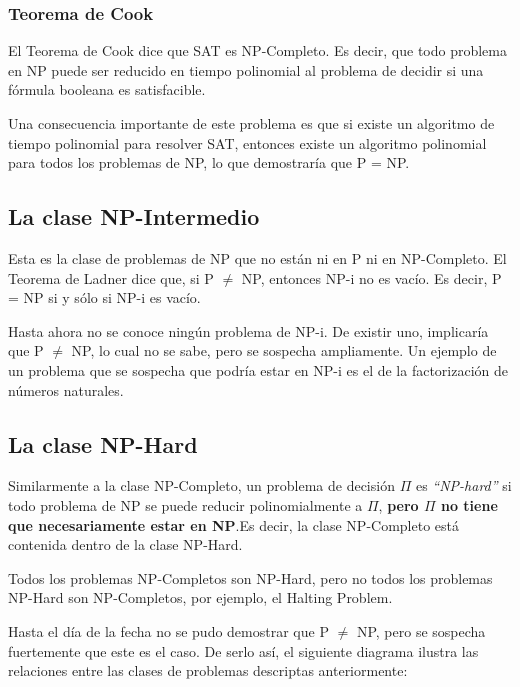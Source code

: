 \subsubsection{Teorema de Cook}

El Teorema de Cook dice que SAT es NP-Completo. Es decir, que todo problema en NP puede ser reducido en tiempo polinomial al problema de decidir si una f\'ormula booleana es satisfacible.

Una consecuencia importante de este problema es que si existe un algoritmo de tiempo polinomial para resolver SAT, entonces existe un algoritmo polinomial para todos los problemas de NP, lo que demostrar\'ia que P = NP.


\subsection{La clase NP-Intermedio}

Esta es la clase de problemas de NP que no est\'an ni en P ni en NP-Completo. El Teorema de Ladner dice que, si P $\neq$ NP, entonces NP-i no es vac\'io. Es decir, P = NP si y s\'olo si NP-i es vac\'io.

Hasta ahora no se conoce ning\'un problema de NP-i. De existir uno, implicar\'ia que P $\neq$ NP, lo cual no se sabe, pero se sospecha ampliamente. Un ejemplo de un problema que se sospecha que podr\'ia estar en NP-i es el de la factorizaci\'on de n\'umeros naturales.

\newpage
\subsection{La clase NP-Hard}

Similarmente a la clase NP-Completo, un problema de decisi\'on $\Pi$ es \emph{``NP-hard''} si todo problema de NP se puede reducir polinomialmente a $\Pi$, \textbf{pero $\Pi$ no tiene que necesariamente estar en NP}.Es decir, la clase NP-Completo est\'a contenida dentro de la clase NP-Hard. 

Todos los problemas NP-Completos son NP-Hard, pero no todos los problemas NP-Hard son NP-Completos, por ejemplo, el Halting Problem.

Hasta el d\'ia de la fecha no se pudo demostrar que P $\neq$ NP, pero se sospecha fuertemente que este es el caso. De serlo as\'i, el siguiente diagrama ilustra las relaciones entre las clases de problemas descriptas anteriormente:

\begin{figure}[htb]
    \centering
    
\end{figure}

